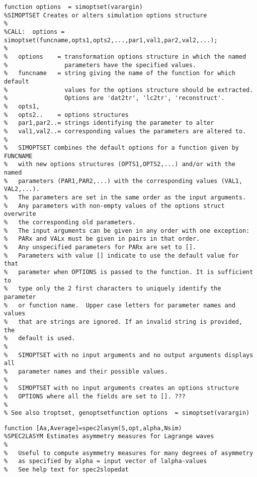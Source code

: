{\begin{verbatim}
function options  = simoptset(varargin)
%SIMOPTSET Creates or alters simulation options structure
%
%CALL:  options = simoptset(funcname,opts1,opts2,...,par1,val1,par2,val2,...);
%
%   options    = transformation options structure in which the named 
%                parameters have the specified values.  
%   funcname   = string giving the name of the function for which default
%                values for the options structure should be extracted.
%                Options are 'dat2tr', 'lc2tr', 'reconstruct'.
%   opts1,
%   opts2..    = options structures
%   par1,par2..= strings identifying the parameter to alter
%   val1,val2..= corresponding values the parameters are altered to.
%   
%   SIMOPTSET combines the default options for a function given by FUNCNAME
%   with new options structures (OPTS1,OPTS2,...) and/or with the named
%   parameters (PAR1,PAR2,...) with the corresponding values (VAL1, VAL2,...).
%   The parameters are set in the same order as the input arguments.
%   Any parameters with non-empty values of the options struct overwrite
%   the corresponding old parameters. 
%   The input arguments can be given in any order with one exception:
%   PARx and VALx must be given in pairs in that order.
%   Any unspecified parameters for PARx are set to []. 
%   Parameters with value [] indicate to use the default value for that
%   parameter when OPTIONS is passed to the function. It is sufficient to
%   type only the 2 first characters to uniquely identify the parameter
%   or function name.  Upper case letters for parameter names and values
%   that are strings are ignored. If an invalid string is provided, the
%   default is used.
%   
%   SIMOPTSET with no input arguments and no output arguments displays all 
%   parameter names and their possible values.
%
%   SIMOPTSET with no input arguments creates an options structure
%   OPTIONS where all the fields are set to []. ???
%
% See also troptset, genoptsetfunction options  = simoptset(varargin)
\end{verbatim}
\clearpage

\begin{verbatim}
function [Aa,Average]=spec2lasym(S,opt,alpha,Nsim)
%SPEC2LASYM Estimates asymmetry measures for Lagrange waves
%
%   Useful to compute asymmetry measures for many degrees of asymmetry
%   as specified by alpha = input vector of lalpha-values
%   See help text for spec2slopedat
\end{verbatim}
\clearpage

}
